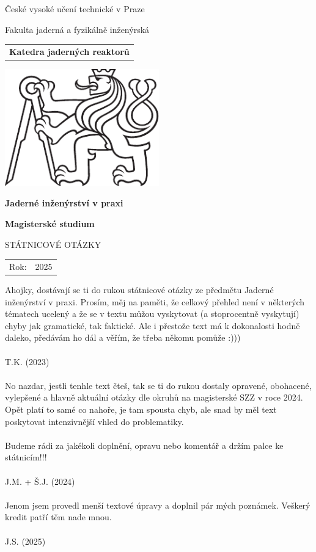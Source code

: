 \documentclass[a4paper, 11pt]{article}
\newcommand{\logoCVUT}{\includegraphics[width = 0.5\textwidth]{img/symbol_cvut_konturova_verze_cb.pdf}}
\begin{document}
% 
% 

\thispagestyle{empty}

\begin{center}
	{\LARGE
		České vysoké učení technické v Praze \par
		Fakulta jaderná a fyzikálně inženýrská
	}
    \vspace{10mm}

    \begin{tabular}{c}
		\textbf{Katedra jaderných reaktorů} \\[3pt]
    \end{tabular}

   \vspace{10mm} \logoCVUT \vspace{15mm}

   {\huge \textbf{Jaderné inženýrství v praxi}\par}
   \vspace{5mm}
   {\huge \textbf{Magisterské studium}\par}

   \vspace{15mm}
   {\Large \MakeUppercase{Státnicové otázky}}

   \vfill
   {\large
    \begin{tabular}{ll}
    Rok: & 2025
    \end{tabular}
   }
\end{center}

\newpage
\thispagestyle{empty}

\vfill

\vspace{1em}

Ahojky, dostávají se ti do rukou státnicové otázky ze předmětu Jaderné inženýrství v praxi. Prosím, měj na paměti, že celkový přehled není v některých tématech ucelený a že se v textu můžou vyskytovat (a stoprocentně vyskytují) chyby jak gramatické, tak faktické. Ale i přestože text má k dokonalosti hodně daleko, předávám ho dál a věřím, že třeba někomu pomůže :)))\\
\\
T.K. (2023)\\
\\
No nazdar, jestli tenhle text čteš, tak se ti do rukou dostaly opravené, obohacené, vylepšené a hlavně aktuální otázky dle okruhů na magisterské SZZ v roce 2024. Opět platí to samé co nahoře, je tam spousta chyb, ale snad by měl text poskytovat intenzivnější vhled do problematiky.\\
\\
Budeme rádi za jakékoli doplnění, opravu nebo komentář a držím palce ke státnicím!!!\\
\\
J.M. + Š.J. (2024)\\
\\
Jenom jsem provedl menší textové úpravy a doplnil pár mých poznámek. Veškerý kredit patří těm nade mnou.\\
\\
J.S. (2025)
\end{document}

